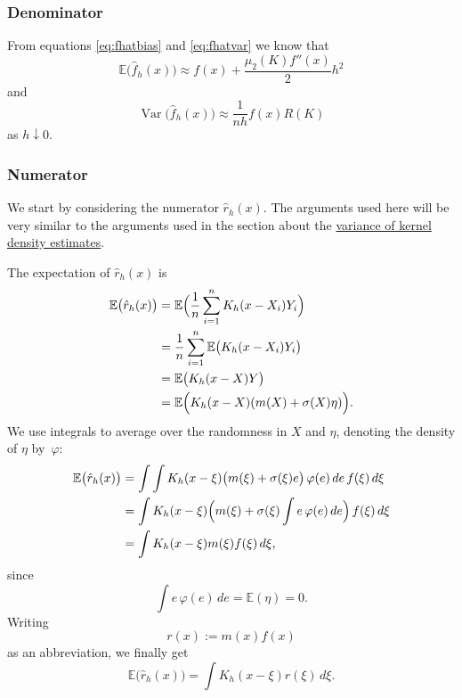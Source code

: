 \documentclass[
  a4paper,
]{article}
\theoremstyle{definition}
\theoremstyle{definition}
\theoremstyle{definition}
\theoremstyle{definition}
\theoremstyle{remark}
\begin{document}
\subsubsection*{Denominator}\label{denominator}

From equations \eqref{eq:fhatbias} and \eqref{eq:fhatvar} we know that
\begin{equation*}
  \mathbb{E}\bigl( \hat f_h(x) \bigr)
  \approx f(x) + \frac{\mu_2(K) f''(x)}{2} h^2
\end{equation*}
and
\begin{equation*}
  \mathop{\mathrm{Var}}\bigl( \hat f_h(x) \bigr)
  \approx \frac{1}{nh} f(x) R(K)
\end{equation*}
as \(h \downarrow 0\).

\subsubsection*{Numerator}\label{numerator}

We start by considering the numerator \(\hat r_h(x)\). The arguments used here
will be very similar to the arguments used in the section about the
\hyperref[X02-error-var]{variance of kernel density estimates}.

The expectation of \(\hat r_h(x)\) is
\begin{align*}
  \mathbb{E}\bigl( \hat r_h(x) \bigr)
  &= \mathbb{E}\Bigl( \frac1n \sum_{i=1}^n K_h(x - X_i) Y_i \Bigr) \\
  &= \frac1n \sum_{i=1}^n \mathbb{E}\bigl( K_h(x - X_i) Y_i \bigr) \\
  &= \mathbb{E}\bigl( K_h(x - X) Y \bigr) \\
  &= \mathbb{E}\Bigl( K_h(x - X) (m(X) + \sigma(X)\eta) \Bigr).
\end{align*}
We use integrals to average over the randomness in \(X\) and \(\eta\),
denoting the density of \(\eta\) by~\(\varphi\):
\begin{align*}
  \mathbb{E}\bigl( \hat r_h(x) \bigr)
  &= \int \int K_h(x - \xi) \bigl( m(\xi) + \sigma(\xi) e \bigr) \, \varphi(e) \, de \, f(\xi) \, d\xi \\
  &= \int K_h(x - \xi) \Bigl( m(\xi) +\sigma(\xi) \int e \, \varphi(e) \, de \Bigr) \, f(\xi) \, d\xi \\
  &= \int K_h(x - \xi) m(\xi) f(\xi) \, d\xi,
\end{align*}
since
\begin{equation*}
  \int e \, \varphi(e) \, de
  = \mathbb{E}(\eta)
  = 0.
\end{equation*}
Writing
\begin{equation*}
  r(x)
  := m(x) f(x)
\end{equation*}
as an abbreviation, we finally get
\begin{equation*}
  \mathbb{E}\bigl( \hat r_h(x) \bigr)
  = \int K_h(x - \xi) r(\xi) \, d\xi.
\end{equation*}
\end{document}
